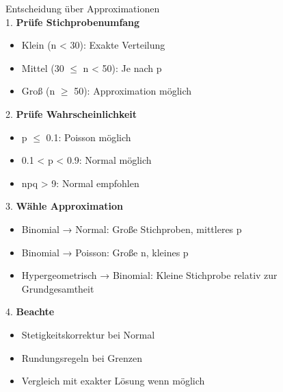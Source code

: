 \begin{KR}{Entscheidung über Approximationen}\\
1. \textbf{Prüfe Stichprobenumfang}
   \begin{itemize}
   \item Klein (n < 30): Exakte Verteilung
   \item Mittel (30 $\leq$ n < 50): Je nach p
   \item Groß (n $\geq$ 50): Approximation möglich
   \end{itemize}

2. \textbf{Prüfe Wahrscheinlichkeit}
   \begin{itemize}
   \item p $\leq$ 0.1: Poisson möglich
   \item 0.1 < p < 0.9: Normal möglich
   \item npq > 9: Normal empfohlen
   \end{itemize}

3. \textbf{Wähle Approximation}
   \begin{itemize}
   \item Binomial → Normal: Große Stichproben, mittleres p
   \item Binomial → Poisson: Große n, kleines p
   \item Hypergeometrisch → Binomial: Kleine Stichprobe relativ zur Grundgesamtheit
   \end{itemize}

4. \textbf{Beachte}
   \begin{itemize}
   \item Stetigkeitskorrektur bei Normal
   \item Rundungsregeln bei Grenzen
   \item Vergleich mit exakter Lösung wenn möglich
   \end{itemize}
\end{KR}

